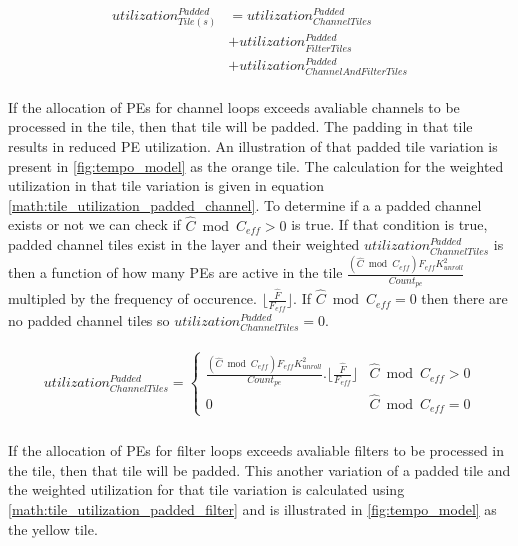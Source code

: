 \begin{equation}
    \begin{aligned}
        utilization^{Padded}_{Tile(s)} & = utilization^{Padded}_{ChannelTiles} \\
                                       & + utilization^{Padded}_{FilterTiles} \\
                                       & + utilization^{Padded}_{ChannelAndFilterTiles} \\
    \end{aligned}
    \label{math:unpadded_tiles_weighted_average}
\end{equation}
  
If the allocation of PEs for channel loops exceeds avaliable channels to be
processed in the tile, then that tile will be padded. The padding in that tile results
in reduced PE utilization. An illustration of that padded tile variation is
present in \autoref{fig:tempo_model} as the orange tile.  The calculation for
the weighted utilization in that tile variation is given in equation
\autoref{math:tile_utilization_padded_channel}. To determine if a a padded channel
exists or not we can check if $\hat{C} \bmod C_{eff} > 0$ is true. If that
condition is true, padded channel tiles exist in the layer and their weighted
$utilization^{Padded}_{ChannelTiles}$ is then a function of how many PEs are
active in the tile $\frac{(\hat{C} \bmod C_{eff}) F_{eff}
K_{unroll}^2}{Count_{pe}}$ multipled by the frequency of occurence. $\lfloor
\frac{\hat{F}}{F_{eff}} \rfloor$. If $\hat{C} \bmod C_{eff} = 0$ then there are
no padded channel tiles so $utilization^{Padded}_{ChannelTiles} = 0$.

\begin{align}
    \begin{gathered}
        utilization^{Padded}_{ChannelTiles} = \begin{cases} \frac{(\hat{C} \bmod C_{eff}) F_{eff} K_{unroll}^2}{Count_{pe}}.\lfloor \frac{\hat{F}}{F_{eff}} \rfloor
         & \hat{C} \bmod C_{eff} > 0 \\ 0
         & \hat{C} \bmod C_{eff} = 0 \end{cases} \\
            \end{gathered}
    \label{math:tile_utilization_padded_channel}
\end{align}

If the allocation of PEs for filter loops exceeds avaliable filters to be
processed in the tile, then that tile will be padded. This another variation of
a padded tile and the weighted utilization for that tile variation is calculated
using \autoref{math:tile_utilization_padded_filter} and is illustrated in
\autoref{fig:tempo_model} as the yellow tile.

